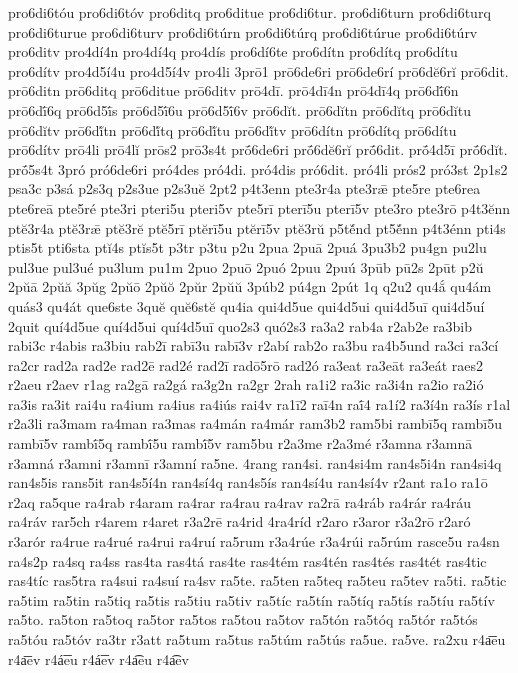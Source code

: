{pro6di6tóu
pro6di6tóv
pro6ditq
pro6ditue
pro6di6tur.
pro6di6turn
pro6di6turq
pro6di6turue
pro6di6turv
pro6di6túrn
pro6di6túrq
pro6di6túrue
pro6di6túrv
pro6ditv
pro4dí4n
pro4dí4q
pro4dís
pro6dí6te
pro6dítn
pro6dítq
pro6dítu
pro6dítv
pro4d5í4u
pro4d5í4v
pro4li
3prō1
prō6de6ri
prō6de6rí
prō6dĕ6rĭ
prō6dit.
prō6ditn
prō6ditq
prō6ditue
prō6ditv
prō4dī.
prō4dī4n
prō4dī4q
prō6dī́6n
prō6dī́6q
prō6d5ī́s
prō6d5ī́6u
prō6d5ī́6v
prō6dĭt.
prō6dĭtn
prō6dĭtq
prō6dĭtu
prō6dĭtv
prō6dĭ́tn
prō6dĭ́tq
prō6dĭ́tu
prō6dĭ́tv
prō6dítn
prō6dítq
prō6dítu
prō6dítv
prō4li
prō4lĭ
prōs2
prō3s4t
prṓ6de6ri
prṓ6dĕ6rĭ
prṓ6dit.
prṓ4d5ī
prṓ6dĭt.
prṓ5s4t
3pró
pró6de6ri
pró4des
pró4di.
pró4dis
pró6dit.
pró4li
prós2
pró3st
2p1s2
psa3c
p3sá
p2s3q
p2s3ue
p2s3uĕ
2pt2
p4t3enn
pte3r4a
pte3rǣ
pte5re
pte6rea
pte6reā
pte5ré
pte3ri
pteri5u
pteri5v
pte5rī
pterī5u
pterī5v
pte3ro
pte3rō
p4t3ĕnn
ptĕ3r4a
ptĕ3rǣ
ptĕ3rĕ
ptĕ5rī
ptĕrī5u
ptĕrī5v
ptĕ3rŭ
p5tĕ́nd
pt5ĕ́nn
p4t3énn
pti4s
ptis5t
pti6sta
ptĭ4s
ptĭs5t
p3tr
p3tu
p2u
2pua
2puā
2puá
3pu3b2
pu4gn
pu2lu
pul3ue
pul3ué
pu3lum
pu1m
2puo
2puō
2puó
2puu
2puú
3pūb
pū2s
2pūt
p2ŭ
2pŭā
2pŭă
3pŭg
2pŭō
2pŭŏ
2pŭr
2pŭŭ
3púb2
pú4gn
2pút
1q
q2u2
qu4ắ
qu4ám
quás3
qu4át
que6ste
3quĕ
quĕ6stĕ
qu4ia
qui4d5ue
qui4d5ui
qui4d5uī
qui4d5uí
2quit
quí4d5ue
quí4d5ui
quí4d5uī
quo2s3
quó2s3
ra3a2
rab4a
r2ab2e
ra3bib
rabi3c
r4abis
ra3biu
rab2ī
rabī3u
rabī3v
r2abí
rab2o
ra3bu
ra4b5und
ra3ci
ra3cí
ra2cr
rad2a
rad2e
rad2ē
rad2é
rad2ī
radō5rō
rad2ó
ra3eat
ra3eāt
ra3eát
raes2
r2aeu
r2aev
r1ag
ra2gā
ra2gá
ra3g2n
ra2gr
2rah
ra1i2
ra3ic
ra3i4n
ra2io
ra2ió
ra3is
ra3it
rai4u
ra4ium
ra4ius
ra4iús
rai4v
ra1ī2
raī4n
raī́4
ra1í2
ra3í4n
ra3ís
r1al
r2a3li
ra3mam
ra4man
ra3mas
ra4mán
ra4már
ram3b2
ram5bi
rambī5q
rambī5u
rambī5v
rambī́5q
rambī́5u
rambī́5v
ram5bu
r2a3me
r2a3mé
r3amna
r3amnā
r3amná
r3amni
r3amnī
r3amní
ra5ne.
4rang
ran4si.
ran4si4m
ran4s5i4n
ran4si4q
ran4s5is
rans5it
ran4s5í4n
ran4sí4q
ran4s5ís
ran4sí4u
ran4sí4v
r2ant
ra1o
ra1ō
r2aq
ra5que
ra4rab
r4aram
ra4rar
ra4rau
ra4rav
ra2rā
ra4ráb
ra4rár
ra4ráu
ra4ráv
rar5ch
r4arem
r4aret
r3a2rē
ra4rid
4ra4ríd
r2aro
r3aror
r3a2rō
r2aró
r3arór
ra4rue
ra4rué
ra4rui
ra4ruí
ra5rum
r3a4rúe
r3a4rúi
ra5rúm
rasce5u
ra4sn
ra4s2p
ra4sq
ra4ss
ras4ta
ras4tá
ras4te
ras4tém
ras4tén
ras4tés
ras4tét
ras4tic
ras4tíc
ras5tra
ra4sui
ra4suí
ra4sv
ra5te.
ra5ten
ra5teq
ra5teu
ra5tev
ra5ti.
ra5tic
ra5tim
ra5tin
ra5tiq
ra5tis
ra5tiu
ra5tiv
ra5tíc
ra5tín
ra5tíq
ra5tís
ra5tíu
ra5tív
ra5to.
ra5ton
ra5toq
ra5tor
ra5tos
ra5tou
ra5tov
ra5tón
ra5tóq
ra5tór
ra5tós
ra5tóu
ra5tóv
ra3tr
r3att
ra5tum
ra5tus
ra5túm
ra5tús
ra5ue.
ra5ve.
ra2xu
r4a͞eu
r4a͞ev
r4á͞eu
r4á͞ev
r4a͡eu
r4a͡ev
}
